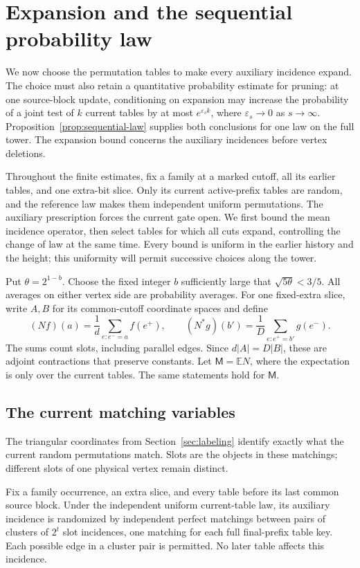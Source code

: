 \section{Expansion and the sequential probability law}
\label{sec:expansion}

We now choose the permutation tables to make every auxiliary incidence
expand.  The choice must also retain a quantitative probability estimate
for pruning: at one source-block update, conditioning on expansion may
increase the probability of a joint test of $k$ current tables by at most
$e^{\varepsilon_s k}$, where $\varepsilon_s\to0$ as $s\to\infty$.
Proposition~\ref{prop:sequential-law} supplies both conclusions for one
law on the full tower.  The expansion bound concerns the auxiliary
incidences before vertex deletions.

Throughout the finite estimates, fix a family at a marked cutoff, all
its earlier tables, and one extra-bit slice.  Only its current
active-prefix tables are random, and the reference law makes them
independent uniform permutations.  The auxiliary prescription forces
the current gate open.  We first bound the mean incidence operator,
then select tables for which all cuts expand, controlling the change of
law at the same time.  Every bound is uniform in the earlier history
and the height; this uniformity will permit successive choices along
the tower.

Put $\theta=2^{1-b}$.  Choose the fixed integer $b$ sufficiently large
that $\sqrt{5\theta}<3/5$.  All averages on either vertex side are
probability averages.  For one fixed-extra slice, write $A,B$ for its
common-cutoff coordinate spaces and define
\[
 (Nf)(a)=\frac1d\sum_{e:e^-=a}f(e^+),\qquad
 (N^*g)(b')=\frac1D\sum_{e:e^+=b'}g(e^-).
\]
The sums count slots, including parallel edges.  Since $d|A|=D|B|$,
these are adjoint contractions that preserve constants.  Let
$\mathsf{M}=\mathbb E N$, where the expectation is only over the current tables.
The same statements hold for $\mathsf{M}$.

\subsection{The current matching variables}

The triangular coordinates from Section~\ref{sec:labeling} identify
exactly what the current random permutations match.  Slots are the
objects in these matchings; different slots of one physical vertex
remain distinct.

\begin{lemma}\label{lem:fresh-matching-coordinates}
Fix a family occurrence, an extra slice, and every table before its last
common source block.  Under the independent uniform current-table law,
its auxiliary incidence is randomized by independent
perfect matchings between pairs of clusters of $2^t$ slot incidences, one
matching for each full final-prefix table key.  Each possible edge in a
cluster pair is permitted.  No later table affects this incidence.
\end{lemma}

